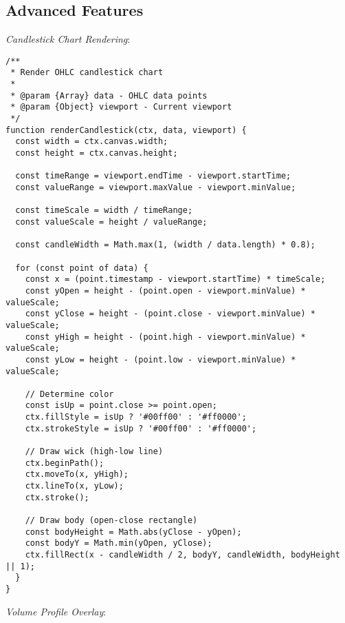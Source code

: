 \documentclass[11pt]{article}
\begin{document}
\subsection{Advanced Features}
\label{sec:org56f41da}

\emph{Candlestick Chart Rendering}:

\begin{verbatim}
/**
 * Render OHLC candlestick chart
 * 
 * @param {Array} data - OHLC data points
 * @param {Object} viewport - Current viewport
 */
function renderCandlestick(ctx, data, viewport) {
  const width = ctx.canvas.width;
  const height = ctx.canvas.height;
  
  const timeRange = viewport.endTime - viewport.startTime;
  const valueRange = viewport.maxValue - viewport.minValue;
  
  const timeScale = width / timeRange;
  const valueScale = height / valueRange;
  
  const candleWidth = Math.max(1, (width / data.length) * 0.8);
  
  for (const point of data) {
    const x = (point.timestamp - viewport.startTime) * timeScale;
    const yOpen = height - (point.open - viewport.minValue) * valueScale;
    const yClose = height - (point.close - viewport.minValue) * valueScale;
    const yHigh = height - (point.high - viewport.minValue) * valueScale;
    const yLow = height - (point.low - viewport.minValue) * valueScale;
    
    // Determine color
    const isUp = point.close >= point.open;
    ctx.fillStyle = isUp ? '#00ff00' : '#ff0000';
    ctx.strokeStyle = isUp ? '#00ff00' : '#ff0000';
    
    // Draw wick (high-low line)
    ctx.beginPath();
    ctx.moveTo(x, yHigh);
    ctx.lineTo(x, yLow);
    ctx.stroke();
    
    // Draw body (open-close rectangle)
    const bodyHeight = Math.abs(yClose - yOpen);
    const bodyY = Math.min(yOpen, yClose);
    ctx.fillRect(x - candleWidth / 2, bodyY, candleWidth, bodyHeight || 1);
  }
}
\end{verbatim}

\emph{Volume Profile Overlay}:
\end{document}
